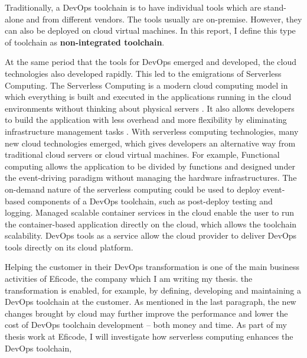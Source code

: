 \par
Traditionally, a DevOps toolchain is to have individual tools which are stand-alone and from different vendors. The tools usually are on-premise. However, they can also be deployed on cloud virtual machines. In this report, I define this type of toolchain as \textbf{non-integrated toolchain}.
\par
At the same period that the tools for DevOps emerged and developed, the cloud technologies also developed rapidly. This led to the emigrations of Serverless Computing. 
The Serverless Computing is a modern cloud computing model in which everything is built and executed in the applications running in the cloud environments without thinking about physical servers \cite{Serverle81:online}. It also allows developers to build the application with less overhead \cite{Serverle81:online} and more flexibility by eliminating infrastructure management tasks \cite{Serverle73:online}.
With serverless computing technologies, many new cloud technologies emerged, which gives developers an alternative way from traditional cloud servers or cloud virtual machines. For example, Functional computing allows the application to be divided by functions and designed under the event-driving paradigm without managing the hardware infrastructures. The on-demand nature of the serverless computing could be used to deploy event-based components of a DevOps toolchain, such as post-deploy testing and logging.
Managed scalable container services in the cloud enable the user to run the container-based application directly on the cloud, which allows the toolchain scalability. DevOps tools as a service \cite{DevOpsas45:online} allow the cloud provider to deliver DevOps tools directly on its cloud platform.
\par
Helping the customer in their DevOps transformation is one of the main business activities of Eficode, the company which I am writing my thesis. the transformation is enabled, for example, by defining, developing and maintaining a DevOps toolchain at the customer. As mentioned in the last paragraph, the new changes brought by cloud may further improve the performance and lower the cost of DevOps toolchain development -- both money and time. As part of my thesis work at Eficode, I will investigate how serverless computing enhances the DevOps toolchain,
